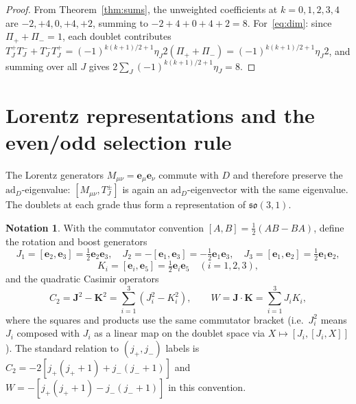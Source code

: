 \documentclass{birkjour}
\theoremstyle{definition}
\newtheorem{notn}[thm]{Notation}
\theoremstyle{remark}
\numberwithin{equation}{section}
\newcommand{\so}{\mathfrak{so}}
\newcommand{\e}[1]{\bm{e}_{#1}}
\newcommand{\ad}{\mathrm{ad}}
\begin{document}
\begin{proof}
From Theorem~\ref{thm:sums}, the unweighted coefficients
at $k=0,1,2,3,4$ are $-2,+4,0,+4,+2$, summing to
$-2+4+0+4+2=8$.
For~\eqref{eq:dim}: since $\Pi_++\Pi_-=1$,
each doublet contributes
$T^+_J T^-_J+T^-_J T^+_J
=(-1)^{k(k+1)/2+1}\eta_J 2(\Pi_++\Pi_-)
=(-1)^{k(k+1)/2+1}\eta_J 2$,
and summing over all $J$ gives
$2\sum_J(-1)^{k(k+1)/2+1}\eta_J=8$.
\end{proof}


\section{Lorentz representations and the even/odd
selection rule}\label{sec:lorentz}

The Lorentz generators $M_{\mu\nu}=\e{\mu}\e{\nu}$ commute
with $D$ and therefore preserve the $\ad_D$-eigenvalue:
$[M_{\mu\nu},T^\pm_J]$ is again an $\ad_D$-eigenvector
with the same eigenvalue.
The doublets at each grade thus form a representation
of $\so(3,1)$.

\begin{notn}\label{not:lorentz-generators}
With the commutator convention
$[A,B]=\tfrac12(AB-BA)$, define the rotation and
boost generators
\begin{equation}\label{eq:JK-def}
J_1=[{\e{2}},{\e{3}}]=\tfrac12\e{2}\e{3},\quad
J_2=-[{\e{1}},{\e{3}}]=-\tfrac12\e{1}\e{3},\quad
J_3=[{\e{1}},{\e{2}}]=\tfrac12\e{1}\e{2},
\end{equation}
\begin{equation}
K_i=[{\e{i}},{\e{5}}]=\tfrac12\e{i}\e{5}\quad(i=1,2,3),
\end{equation}
and the quadratic Casimir operators
\begin{equation}\label{eq:casimir-def}
C_2=\mathbf{J}^2-\mathbf{K}^2
=\sum_{i=1}^{3}(J_i^2-K_i^2),\qquad
W=\mathbf{J}\cdot\mathbf{K}=\sum_{i=1}^{3}J_i K_i,
\end{equation}
where the squares and products use the same commutator
bracket (i.e.\ $J_i^2$ means $J_i$ composed with $J_i$ as
a linear map on the doublet space via $X\mapsto[J_i,[J_i,X]]$).
The standard relation to $(j_+,j_-)$ labels is
$C_2=-2[j_+(j_++1)+j_-(j_-+1)]$ and
$W=-[j_+(j_++1)-j_-(j_-+1)]$ in this convention.
\end{notn}
\end{document}
